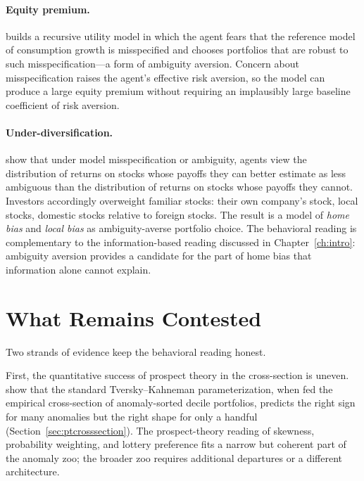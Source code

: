 \paragraph{Equity premium.}
\citet{maenhout2004} builds a recursive utility model in which the agent fears that the reference model of consumption growth is misspecified and chooses portfolios that are robust to such misspecification---a form of ambiguity aversion. Concern about misspecification raises the agent's effective risk aversion, so the model can produce a large equity premium without requiring an implausibly large baseline coefficient of risk aversion.

\paragraph{Under-diversification.}
\citet{uppal2003} show that under model misspecification or ambiguity, agents view the distribution of returns on stocks whose payoffs they can better estimate as less ambiguous than the distribution of returns on stocks whose payoffs they cannot. Investors accordingly overweight familiar stocks: their own company's stock, local stocks, domestic stocks relative to foreign stocks. The result is a model of \emph{home bias} and \emph{local bias} as ambiguity-averse portfolio choice. The behavioral reading is complementary to the information-based reading discussed in Chapter~\ref{ch:intro}: ambiguity aversion provides a candidate for the part of home bias that information alone cannot explain.

\section{What Remains Contested}
\label{sec:contested}

Two strands of evidence keep the behavioral reading honest.

First, the quantitative success of prospect theory in the cross-section is uneven. \citet{barberis2021} show that the standard Tversky--Kahneman parameterization, when fed the empirical cross-section of anomaly-sorted decile portfolios, predicts the right sign for many anomalies but the right shape for only a handful (Section~\ref{sec:ptcrosssection}). The prospect-theory reading of skewness, probability weighting, and lottery preference fits a narrow but coherent part of the anomaly zoo; the broader zoo requires additional departures or a different architecture.

